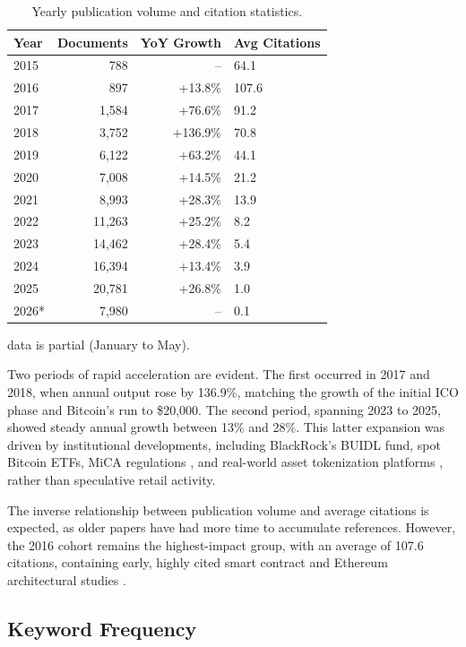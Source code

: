 \documentclass[11pt]{article}
\begin{document}
\begin{table}[h]
\centering
\caption{Yearly publication volume and citation statistics.}
\label{tab:yearly}
\begin{tabular}{lrrl}
\toprule
Year & Documents & YoY Growth & Avg Citations \\
\midrule
2015 & 788 & -- & 64.1 \\
2016 & 897 & +13.8\% & 107.6 \\
2017 & 1,584 & +76.6\% & 91.2 \\
2018 & 3,752 & +136.9\% & 70.8 \\
2019 & 6,122 & +63.2\% & 44.1 \\
2020 & 7,008 & +14.5\% & 21.2 \\
2021 & 8,993 & +28.3\% & 13.9 \\
2022 & 11,263 & +25.2\% & 8.2 \\
2023 & 14,462 & +28.4\% & 5.4 \\
2024 & 16,394 & +13.4\% & 3.9 \\
2025 & 20,781 & +26.8\% & 1.0 \\
2026* & 7,980 & -- & 0.1 \\
\bottomrule
\end{tabular}
\end{table}

 data is partial (January to May).

Two periods of rapid acceleration are evident. The first occurred in 2017 and 2018, when annual output rose by 136.9\%, matching the growth of the initial ICO phase and Bitcoin's run to \$20,000. The second period, spanning 2023 to 2025, showed steady annual growth between 13\% and 28\%. This latter expansion was driven by institutional developments, including BlackRock's BUIDL fund, spot Bitcoin ETFs, MiCA regulations \citep{eu2023mica}, and real-world asset tokenization platforms \citep{rwa2026dashboard}, rather than speculative retail activity.

The inverse relationship between publication volume and average citations is expected, as older papers have had more time to accumulate references. However, the 2016 cohort remains the highest-impact group, with an average of 107.6 citations, containing early, highly cited smart contract and Ethereum architectural studies \citep{buterin2014ethereum, wood2014ethereum}.

\subsection{Keyword Frequency}
\end{document}
